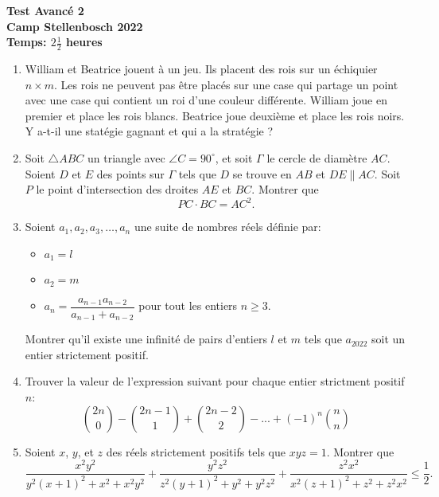 \documentclass{article}
\begin{document}
\thispagestyle{empty}

\begin{center}
  \textbf{\Large Test Avanc\'e 2}
  \\ \vspace{1em}
  \textbf{\large Camp Stellenbosch 2022}
  \\ \vspace{1em}
  \textbf{\large Temps: $2\frac{1}{2}$ heures}
\end{center}

\bigskip

\vfill

\begin{enumerate}[itemsep=\fill]

\item %
William et Beatrice jouent \`a un jeu. Ils placent des rois sur un \'echiquier $n \times m$. Les rois ne peuvent pas \^etre plac\'es sur une case qui partage un point avec une case qui contient un roi d'une couleur diff\'erente. William joue en premier et place les rois blancs. Beatrice joue deuxi\`eme et place les rois noirs. Y a-t-il une stat\'egie gagnant et qui a la strat\'egie ?


\item %
Soit $\triangle ABC$ un triangle avec $\angle C = 90^\circ$, et soit $\Gamma$ le cercle de diam\`etre $AC$.
Soient $D$ et $E$ des points sur $\Gamma$ tels que $D$ se trouve en $AB$ et $DE \parallel AC$. Soit $P$ le point d'intersection des droites $AE$ et $BC$.
Montrer que
\[ PC \cdot BC = AC^2. \]

\vspace{0pt}


\item %
Soient $a_1, a_2, a_3, \dots, a_n$ une suite de nombres r\'eels d\'efinie par:
\begin{itemize}
	\item $a_1 = l$
	\item $a_2 = m$
	\item $a_n = \dfrac{a_{n-1}a_{n-2}}{a_{n-1}+a_{n-2}}$ pour tout les entiers $n \geq 3$.
\end{itemize}
Montrer qu'il existe une infinit\'e de pairs d'entiers $l$ et $m$ tels que $a_{2022}$ soit un entier strictement positif.


\item %
Trouver la valeur de l'expression suivant pour chaque entier strictment positif $n$:
\[ {2n \choose 0} -{2n-1 \choose 1}+{2n-2 \choose 2}-...+(-1)^n{n \choose n} \]

\vspace{0pt}


\item %
Soient $x$, $y$, et $z$ des r\'eels strictement positifs tels que $xyz = 1$. Montrer que
\[ \frac{x^2y^2}{y^2(x+1)^2+x^2+x^2y^2} +\frac{y^2z^2}{z^2(y+1)^2+y^2+y^2z^2} +\frac{z^2x^2}{x^2(z+1)^2+z^2+z^2x^2} \leq \frac{1}{2}. \]

\end{enumerate}
\end{document}
